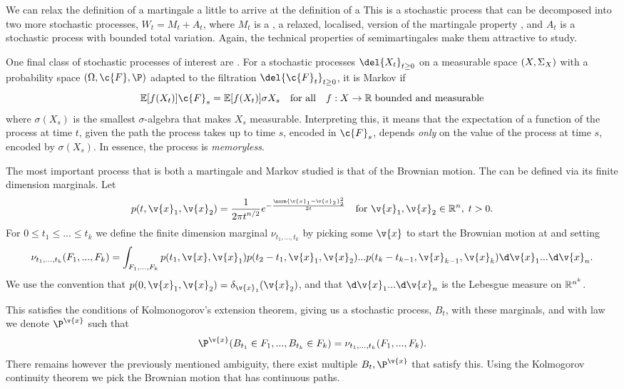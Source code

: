We can relax the definition of a martingale a little to arrive at the definition of a 
This is a stochastic process that can be decomposed into two more stochastic processes, \(W_t = M_t + A_t\), where \(M_t\) is a , a relaxed, localised, version of the martingale property , and \(A_t\) is a stochastic process with bounded total variation.
Again, the technical properties of semimartingales make them attractive to study.

One final class of stochastic processes of interest are .
For a stochastic processes \(\del{X_t}_{t\geq 0}\) on a measurable space \((X, \Sigma_{X})\) with a probability space \((\Omega, \c{F}, \P)\) adapted to the filtration \(\del{\c{F}_t}_{t\geq 0}\), it is Markov if 
\[
	\E\sbrdelim{f(X_t)}{\c{F}_s} = \E\sbrdelim{f(X_t)}{\sigma{X_s}}	\quad \text{for all} \quad f: X\to \R \; \text{bounded and measurable}
\] where \(\sigma(X_s)\) is the smallest \(\sigma\)-algebra that makes \(X_s\) measurable.
Interpreting this, it means that the expectation of a function of the process at time \(t\), given the path the process takes up to time \(s\), encoded in \(\c{F}_s\), depends \emph{only} on the value of the process at time \(s\), encoded by \(\sigma(X_s)\).
In essence, the process is \emph{memoryless}.

The most important process that is both a martingale and Markov studied is that of the Brownian motion.
The  can be defined via its finite dimension marginals.
Let \[p(t, \v{x}_1, \v{x}_2) = \frac{1}{{2\pi t}^{n/2}} e^{-\frac{\norm{\v{x}_1 - \v{x}_2}^2_2}{2t}} \quad \text{for } \v{x}_1, \v{x}_2 \in \R^n, \; t>0.\]
For \(0 \leq t_1 \leq .
.. \leq t_k\) we define the finite dimension marginal \(\nu_{t_1, ..., t_k}\) by picking some \(\v{x}\) to start the Brownian motion at and setting \[\nu_{t_1, ..., t_k}(F_1, ..., F_k) = \int_{F_1, ..., F_k} p(t_1, \v{x}, \v{x}_1)p(t_2-t_1, \v{x}_1, \v{x}_2) ... p(t_k-t_{k-1}, \v{x}_{k-1}, \v{x}_k) \d \v{x}_1...\d \v{x}_n .\]
We use the convention that \(p(0, \v{x}_1, \v{x}_2) = \delta_{\v{x}_1}(\v{x}_2)\), and that \(\d \v{x}_1.
..\d \v{x}_n\) is the Lebesgue measure on \(\mathbb{R}^{n^k}\).

This satisfies the conditions of Kolmonogorov's extension theorem, giving us a stochastic process, \(B_t\), with these marginals, and with law we denote \(\P^{\v{x}}\) such that \[\P^{\v{x}} (B_{t_1} \in F_1, .
	.., B_{t_k}\in F_k) = \nu_{t_1,...,t_k}(F_1, ..., F_k).\]
There remains however the previously mentioned ambiguity, there exist multiple \(B_t, \P^{\v{x}}\) that satisfy this.
Using the Kolmogorov continuity theorem we pick the Brownian motion that has continuous paths.


